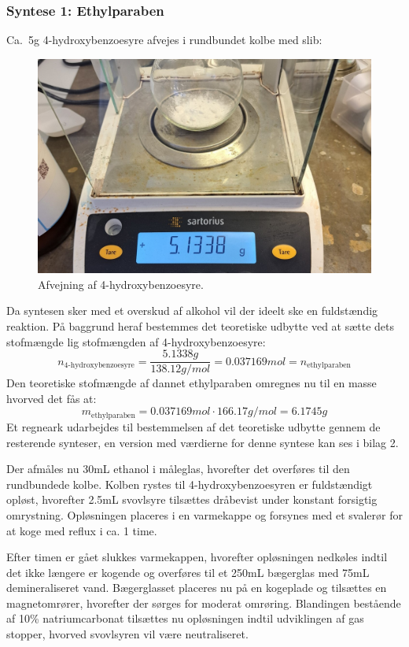     \subsubsection{Syntese 1: Ethylparaben}
    Ca.\ 5g 4-hydroxybenzoesyre afvejes i rundbundet kolbe med slib:
    \begin{figure}[H] \centering
        \includegraphics[width=\textwidth]{billeder/afvejning}
        \caption{Afvejning af 4-hydroxybenzoesyre.}
    \end{figure} 
    Da syntesen sker med et overskud af alkohol vil der ideelt ske en fuldstændig reaktion. På baggrund heraf bestemmes det teoretiske udbytte ved at sætte dets stofmængde lig stofmængden af 4-hydroxybenzoesyre:
    \[
        n_{\text{4-hydroxybenzoesyre}}=\frac{5.1338\si{g}}{138.12\si{g \per mol}}=0.037169\si{mol}=n_{\text{ethylparaben}}
    \]
    Den teoretiske stofmængde af dannet ethylparaben omregnes nu til en masse hvorved det fås at:
    \[
        m_{\text{ethylparaben}}=0.037169\si{mol} \cdot 166.17\si{g\per mol}=6.1745g
    \]
    Et regneark udarbejdes til bestemmelsen af det teoretiske udbytte gennem de resterende synteser, en version med værdierne for denne syntese kan ses i bilag 2.

    Der afmåles nu 30mL ethanol i måleglas, hvorefter det overføres til den rundbundede kolbe. Kolben rystes til 4-hydroxybenzoesyren er fuldstændigt opløst, hvorefter 2.5mL svovlsyre tilsættes dråbevist under konstant forsigtig omrystning. Opløsningen placeres i en varmekappe og forsynes med et svalerør for at koge med reflux i ca. 1 time.

    Efter timen er gået slukkes varmekappen, hvorefter opløsningen nedkøles indtil det ikke længere er kogende og overføres til et 250mL bægerglas med 75mL demineraliseret vand. Bægerglasset placeres nu på en kogeplade og tilsættes en magnetomrører, hvorefter der sørges for moderat omrøring. Blandingen bestående af 10\% natriumcarbonat tilsættes nu opløsningen indtil udviklingen af gas stopper, hvorved svovlsyren vil være neutraliseret.

